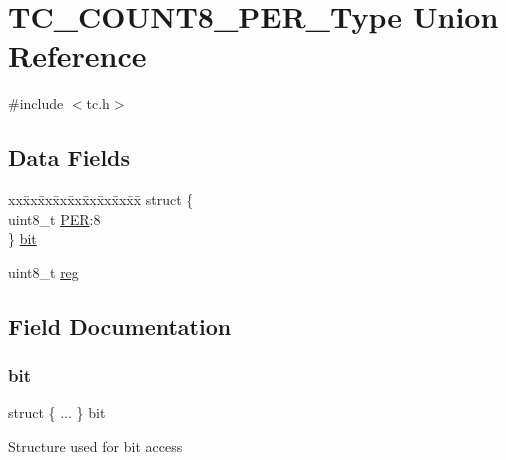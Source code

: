 \hypertarget{union_t_c___c_o_u_n_t8___p_e_r___type}{}\section{T\+C\+\_\+\+C\+O\+U\+N\+T8\+\_\+\+P\+E\+R\+\_\+\+Type Union Reference}
\label{union_t_c___c_o_u_n_t8___p_e_r___type}


{\ttfamily \#include $<$tc.\+h$>$}

\subsection*{Data Fields}
\begin{DoxyCompactItemize}
\item 
\begin{tabbing}
xx\=xx\=xx\=xx\=xx\=xx\=xx\=xx\=xx\=\kill
struct \{\\
\>uint8\_t \mbox{\hyperlink{union_t_c___c_o_u_n_t8___p_e_r___type_a7368ef79c463d39c82b562902306733a}{PER}}:8\\
\} \mbox{\hyperlink{union_t_c___c_o_u_n_t8___p_e_r___type_a0649e4d7d46a761dcf5813cacd57b824}{bit}}\\

\end{tabbing}\item 
uint8\+\_\+t \mbox{\hyperlink{union_t_c___c_o_u_n_t8___p_e_r___type_a9428adc9af4653a2050e2536b55dec8d}{reg}}
\end{DoxyCompactItemize}


\subsection{Field Documentation}
\mbox{\label{union_t_c___c_o_u_n_t8___p_e_r___type_a0649e4d7d46a761dcf5813cacd57b824}} 
\subsubsection{\texorpdfstring{bit}{bit}}
{\footnotesize\ttfamily struct \{ ... \}   bit}

Structure used for bit access \mbox{\label{union_t_c___c_o_u_n_t8___p_e_r___type_a7368ef79c463d39c82b562902306733a}} 
